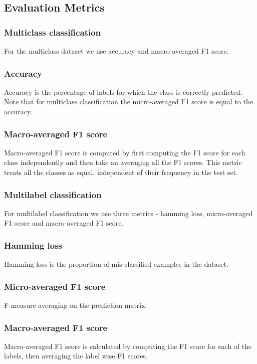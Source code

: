 \subsection{Evaluation Metrics}

\subsubsection{Multiclass classification}
For the multiclass dataset we use accuracy and macro-averaged F1 score.

\subsubsection{Accuracy} Accuracy is the percentage of labels for which the class is correctly predicted. Note that for multiclass classification the micro-averaged F1 score is equal to the accuracy.

\subsubsection{Macro-averaged F1 score} 
Macro-averaged F1 score is computed by first computing the F1 score for each class independently and then take an averaging all the F1 scores. This metric treats all the classes as equal, independent of their frequency in the test set.

\subsubsection{Multilabel classification}
For multilabel classification we use three metrics - hamming loss, micro-averaged F1 score and macro-averaged F1 score. 

\subsubsection{Hamming loss} Hamming loss is the proportion of mis-classified examples in the dataset.
\subsubsection{Micro-averaged F1 score} F-measure averaging on the prediction matrix.

\subsubsection{Macro-averaged F1 score} Macro-averaged F1 score is calculated by computing the F1 score for each of the labels, then averaging the label wise F1 scores.